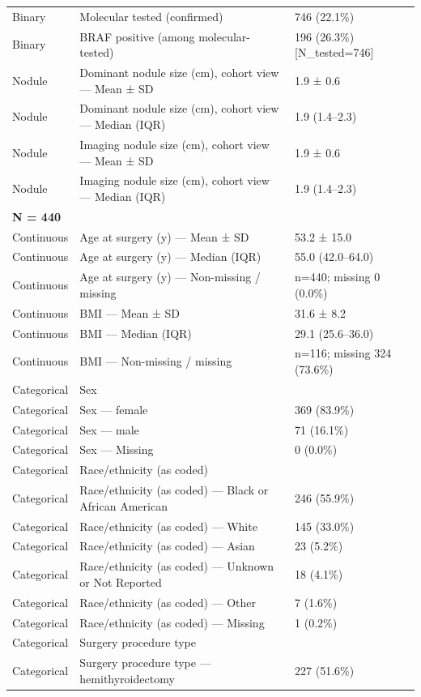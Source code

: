 \begin{table}[htbp]
\begin{tabular}{lll}
Binary & Molecular tested (confirmed) & 746 (22.1\%) \\
Binary & BRAF positive (among molecular-tested) & 196 (26.3\%) [N\_tested=746] \\
Nodule & Dominant nodule size (cm), cohort view — Mean ± SD & 1.9 ± 0.6 \\
Nodule & Dominant nodule size (cm), cohort view — Median (IQR) & 1.9 (1.4–2.3) \\
Nodule & Imaging nodule size (cm), cohort view — Mean ± SD & 1.9 ± 0.6 \\
Nodule & Imaging nodule size (cm), cohort view — Median (IQR) & 1.9 (1.4–2.3) \\
\multicolumn{3}{l}{\textbf{N = 440}} \\
Continuous & Age at surgery (y) — Mean ± SD & 53.2 ± 15.0 \\
Continuous & Age at surgery (y) — Median (IQR) & 55.0 (42.0–64.0) \\
Continuous & Age at surgery (y) — Non-missing / missing & n=440; missing 0 (0.0\%) \\
Continuous & BMI — Mean ± SD & 31.6 ± 8.2 \\
Continuous & BMI — Median (IQR) & 29.1 (25.6–36.0) \\
Continuous & BMI — Non-missing / missing & n=116; missing 324 (73.6\%) \\
Categorical & Sex &  \\
Categorical & Sex — female & 369 (83.9\%) \\
Categorical & Sex — male & 71 (16.1\%) \\
Categorical & Sex — Missing & 0 (0.0\%) \\
Categorical & Race/ethnicity (as coded) &  \\
Categorical & Race/ethnicity (as coded) — Black or African American & 246 (55.9\%) \\
Categorical & Race/ethnicity (as coded) — White & 145 (33.0\%) \\
Categorical & Race/ethnicity (as coded) — Asian & 23 (5.2\%) \\
Categorical & Race/ethnicity (as coded) — Unknown or Not Reported & 18 (4.1\%) \\
Categorical & Race/ethnicity (as coded) — Other & 7 (1.6\%) \\
Categorical & Race/ethnicity (as coded) — Missing & 1 (0.2\%) \\
Categorical & Surgery procedure type &  \\
Categorical & Surgery procedure type — hemithyroidectomy & 227 (51.6\%) \\

\end{tabular}
\end{table}
